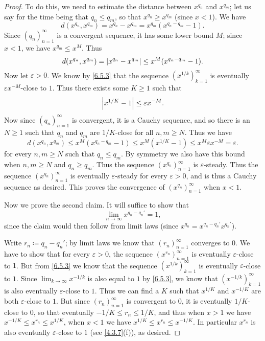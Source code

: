 \begin{proof}
  To do this, we need to estimate the distance between \(x^{q_n}\) and \(x^{q_m}\);
  let us say for the time being that \(q_n \leq q_m\), so that \(x^{q_n} \geq x^{q_m}\) (since \(x < 1\)).
  We have
  \[
    d(x^{q_n}, x^{q_m}) = x^{q_n} - x^{q_m} = x^{q_m} (x^{q_n - q_m} - 1).
  \]
  Since \((q_n)_{n = 1}^\infty\) is a convergent sequence, it has some lower bound \(M\);
  since \(x < 1\), we have \(x^{q_m} \leq x^M\).
  Thus
  \[
    d(x^{q_n}, x^{q_m}) = \left\lvert x^{q_n} - x^{q_m}\right\rvert \leq x^M (x^{q_n - q_m} - 1).
  \]
  Now let \(\varepsilon > 0\).
  We know by \cref{6.5.3} that the sequence \((x^{1 / k})_{k = 1}^\infty\) is eventually \(\varepsilon x^{-M}\)-close to \(1\).
  Thus there exists some \(K \geq 1\) such that
  \[
    \left\lvert x^{1 / K} - 1\right\rvert \leq \varepsilon x^{-M}.
  \]
  Now since \((q_n)_{n = 1}^\infty\) is convergent, it is a Cauchy sequence, and so there is an \(N \geq 1\) such that \(q_n\) and \(q_m\) are \(1 / K\)-close for all \(n, m \geq N\).
  Thus we have
  \[
    d(x^{q_n}, x^{q_m}) \leq x^M (x^{q_n - q_m} - 1) \leq x^M (x^{1 / K} - 1) \leq x^M \varepsilon x^{-M} = \varepsilon.
  \]
  for every \(n, m \geq N\) such that \(q_n \leq q_m\).
  By symmetry we also have this bound when \(n, m \geq N\) and \(q_n \geq q_m\).
  Thus the sequence \((x^{q_n})_{n = 1}^\infty\) is \(\varepsilon\)-steady.
  Thus the sequence \((x^{q_n})_{n = 1}^\infty\) is eventually \(\varepsilon\)-steady for every \(\varepsilon > 0\), and is thus a Cauchy sequence as desired.
  This proves the convergence of \((x^{q_n})_{n = 1}^\infty\) when \(x < 1\).

  Now we prove the second claim.
  It will suffice to show that
  \[
    \lim_{n \to \infty} x^{q_n - q_n'} = 1,
  \]
  since the claim would then follow from limit laws
  (since \(x^{q_n} = x^{q_n - q_n'} x^{q_n'}\)).

  Write \(r_n \coloneqq q_n - q_n'\);
  by limit laws we know that \((r_n)_{n = 1}^\infty\) converges to \(0\).
  We have to show that for every \(\varepsilon > 0\), the sequence \((x^{r_n})_{n = 1}^\infty\) is eventually \(\varepsilon\)-close to \(1\).
  But from \cref{6.5.3} we know that the sequence \((x^{1 / k})_{k = 1}^\infty\) is eventually \(\varepsilon\)-close to \(1\).
  Since \(\lim_{k \to \infty} x^{-1 / k}\) is also equal to \(1\) by \cref{6.5.3}, we know that \((x^{-1 / k})_{k = 1}^\infty\) is also eventually \(\varepsilon\)-close to \(1\).
  Thus we can find a \(K\) such that \(x^{1 / K}\) and \(x^{-1 / K}\) are both \(\varepsilon\)-close to \(1\).
  But since \((r_n)_{n = 1}^\infty\) is convergent to \(0\), it is eventually \(1 / K\)-close to \(0\), so that eventually \(-1 / K \leq r_n \leq 1 / K\), and thus when \(x > 1\) we have \(x^{-1 / K} \leq x^{r_n} \leq x^{1 / K}\), when \(x < 1\) we have \(x^{1 / K} \leq x^{r_n} \leq x^{-1 / K}\).
  In particular \(x^{r_n}\) is also eventually \(\varepsilon\)-close to \(1\) (see \cref{4.3.7}(f)), as desired.
\end{proof}

